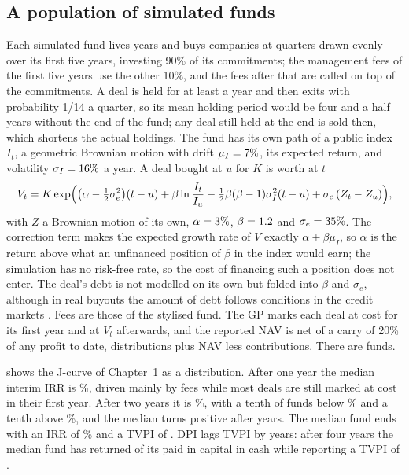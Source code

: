 \begin{chapterrefs}
\subsection{A population of simulated funds}

Each simulated fund lives \jcLife{} years and buys \jcDealsPer{} companies at quarters drawn evenly
over its first five years, investing 90\% of its commitments; the management fees of the first five
years use the other 10\%, and the fees after that are called on top of the commitments. A deal is held for at least a year and
then exits with probability 1/14 a quarter, so its mean holding period would be four and a half years
without the end of the fund; any deal still held at the end is sold then, which shortens the actual
holdings. The fund has its own path of a public index $I_t$, a geometric Brownian motion with drift
$\mu_I=7\%$, its expected return, and volatility $\sigma_I=16\%$ a year. A deal bought at $u$ for
$K$ is worth at $t$
\begin{equation}\label{eq11:deal}
  V_t=K\exp\Bigl(\bigl(\alpha-\tfrac12\sigma_e^2\bigr)(t-u)+\beta\ln\frac{I_t}{I_u}
  -\tfrac12\beta(\beta-1)\sigma_I^2(t-u)+\sigma_e\,(Z_t-Z_u)\Bigr),
\end{equation}
with $Z$ a Brownian motion of its own, $\alpha=3\%$, $\beta=1.2$ and $\sigma_e=35\%$. The
correction term makes the expected growth rate of $V$ exactly $\alpha+\beta\mu_I$, so $\alpha$ is the
return above what an unfinanced position of $\beta$ in the index would earn; the simulation has no
risk-free rate, so the cost of financing such a position does not enter. The deal's debt is not
modelled on its own but folded into $\beta$ and $\sigma_e$, although in real buyouts the amount of debt
follows conditions in the credit markets \parencite{axelson2013}. Fees are those of the stylised fund.
The GP marks each deal at cost for its first year and at $V_t$ afterwards, and the reported NAV is
net of a carry of 20\% of any profit to date, distributions plus NAV less contributions. There are
\jcFunds{} funds.

 shows the J-curve of Chapter~1 as a distribution. After one year the median
interim IRR is \jcIrrOne\%, driven mainly by fees while most deals are still marked at cost in their first year. After two years
it is \jcIrrTwo\%, with a tenth of funds below \jcIrrLoTwo\% and a tenth above \jcIrrHiTwo\%, and the
median turns positive after \jcCross{} years. The median fund ends with an IRR of \jcIrrEnd\% and a
TVPI of \jcTvpiEnd. DPI lags TVPI by years: after four years the median fund has returned \jcDpiFour{}
of its paid in capital in cash while reporting a TVPI of \jcTvpiFour.


\end{chapterrefs}
